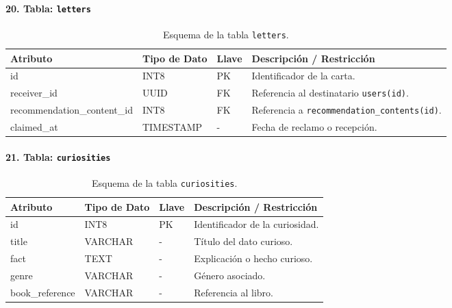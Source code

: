\documentclass[12pt, atypical, journal]{article}
\begin{document}
\paragraph{20. Tabla: \texttt{letters}}
\begin{table}[H]
	\centering
	\begin{tabular}{|l|l|l|p{6.5cm}|}
		\hline
		\textbf{Atributo} & \textbf{Tipo de Dato} & \textbf{Llave} & \textbf{Descripción / Restricción} \\ \hline
		id & INT8 & PK & Identificador de la carta. \\ \hline
		receiver\_id & UUID & FK & Referencia al destinatario \texttt{users(id)}. \\ \hline
		recommendation\_content\_id & INT8 & FK & Referencia a \texttt{recommendation\_contents(id)}. \\ \hline
		claimed\_at & TIMESTAMP & - & Fecha de reclamo o recepción. \\ \hline
	\end{tabular}
	\caption{Esquema de la tabla \texttt{letters}.}
\end{table}

\paragraph{21. Tabla: \texttt{curiosities}}
\begin{table}[H]
	\centering
	\begin{tabular}{|l|l|l|p{6.5cm}|}
		\hline
		\textbf{Atributo} & \textbf{Tipo de Dato} & \textbf{Llave} & \textbf{Descripción / Restricción} \\ \hline
		id & INT8 & PK & Identificador de la curiosidad. \\ \hline
		title & VARCHAR & - & Título del dato curioso. \\ \hline
		fact & TEXT & - & Explicación o hecho curioso. \\ \hline
		genre & VARCHAR & - & Género asociado. \\ \hline
		book\_reference & VARCHAR & - & Referencia al libro. \\ \hline
	\end{tabular}
	\caption{Esquema de la tabla \texttt{curiosities}.}
\end{table}
\end{document}
